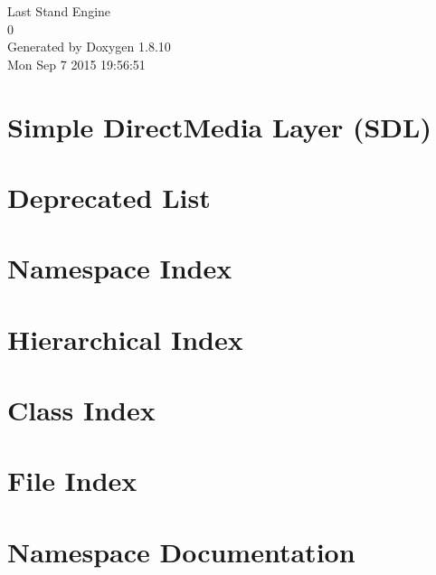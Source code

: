 \documentclass[twoside]{book}
\newcommand{\+}{\discretionary{\mbox{\scriptsize$\hookleftarrow$}}{}{}}
\newcommand{\clearemptydoublepage}{%
  \newpage{\pagestyle{empty}\cleardoublepage}%
}
\begin{document}
\hypersetup{pageanchor=false,
             bookmarks=true,
             bookmarksnumbered=true,
             pdfencoding=unicode
            }
\begin{titlepage}
\vspace*{7cm}
\begin{center}%
{\Large Last Stand Engine \\[1ex]\large 0 }\\
\vspace*{1cm}
{\large Generated by Doxygen 1.8.10}\\
\vspace*{0.5cm}
{\small Mon Sep 7 2015 19:56:51}\\
\end{center}
\end{titlepage}
\clearemptydoublepage
\tableofcontents
\clearemptydoublepage
{}
\hypersetup{pageanchor=true}

\chapter{Simple Direct\+Media Layer (S\+D\+L)}
\label{index}\hypertarget{index}{}
\chapter{Deprecated List}
\label{deprecated}
\hypertarget{deprecated}{}

\chapter{Namespace Index}

\chapter{Hierarchical Index}

\chapter{Class Index}

\chapter{File Index}

\chapter{Namespace Documentation}



\end{document}
